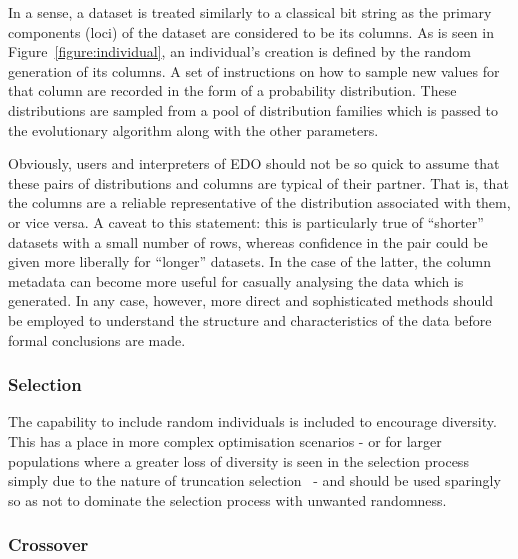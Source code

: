 
In a sense, a dataset is treated similarly to a classical bit string as the
primary components (loci) of the dataset are considered to be its columns. As is
seen in Figure~\ref{figure:individual}, an individual's creation is defined by
the random generation of its columns. A set of instructions on how to sample new
values for that column are recorded in the form of a probability distribution.
These distributions are sampled from a pool of distribution families which is
passed to the evolutionary algorithm along with the other parameters.

Obviously, users and interpreters of EDO should not be so quick to assume that
these pairs of distributions and columns are typical of their partner. That is,
that the columns are a reliable representative of the distribution associated
with them, or vice versa. A caveat to this statement: this is particularly true
of ``shorter'' datasets with a small number of rows, whereas confidence in the
pair could be given more liberally for ``longer'' datasets. In the case of the
latter, the column metadata can become more useful for casually analysing the
data which is generated. In any case, however, more direct and sophisticated
methods should be employed to understand the structure and characteristics of
the data before formal conclusions are made.



\subsubsection{Selection}

The capability to include random individuals is included to encourage diversity.
This has a place in more complex optimisation scenarios \-- or for larger
populations where a greater loss of diversity is seen in the selection process
simply due to the nature of truncation selection~\cite{Tatsuya2002} \-- and
should be used sparingly so as not to dominate the selection process with
unwanted randomness.



\subsubsection{Crossover}


